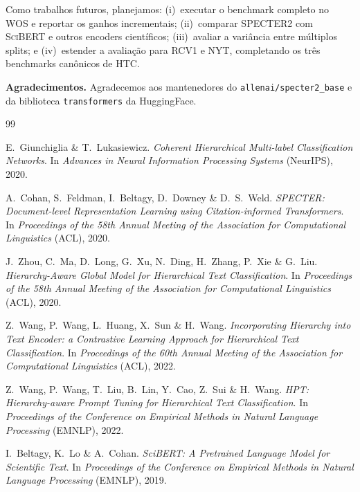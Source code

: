 \documentclass[11pt,a4paper,twoside]{article}
\begin{document}
Como trabalhos futuros, planejamos: (i)~executar o benchmark completo no WOS e
reportar os ganhos incrementais; (ii)~comparar \textsc{SPECTER2} com
\textsc{SciBERT} e outros encoders científicos; (iii)~avaliar a variância entre
múltiplos splits; e (iv)~estender a avaliação para RCV1 e NYT, completando os
três benchmarks canônicos de HTC.

\vspace{0.6em}
\noindent\textbf{Agradecimentos.}
Agradecemos aos mantenedores do \texttt{allenai/specter2\_base}
\cite{cohan2020specter} e da biblioteca \texttt{transformers} da HuggingFace.


\begin{thebibliography}{99}

E.~Giunchiglia \& T.~Lukasiewicz.
\textit{Coherent Hierarchical Multi-label Classification Networks}.
In \textit{Advances in Neural Information Processing Systems} (NeurIPS), 2020.

A.~Cohan, S.~Feldman, I.~Beltagy, D.~Downey \& D.~S.~Weld.
\textit{SPECTER: Document-level Representation Learning using Citation-informed
Transformers}.
In \textit{Proceedings of the 58th Annual Meeting of the Association for
Computational Linguistics} (ACL), 2020.

J.~Zhou, C.~Ma, D.~Long, G.~Xu, N.~Ding, H.~Zhang, P.~Xie \& G.~Liu.
\textit{Hierarchy-Aware Global Model for Hierarchical Text Classification}.
In \textit{Proceedings of the 58th Annual Meeting of the Association for
Computational Linguistics} (ACL), 2020.

Z.~Wang, P.~Wang, L.~Huang, X.~Sun \& H.~Wang.
\textit{Incorporating Hierarchy into Text Encoder: a Contrastive Learning
Approach for Hierarchical Text Classification}.
In \textit{Proceedings of the 60th Annual Meeting of the Association for
Computational Linguistics} (ACL), 2022.

Z.~Wang, P.~Wang, T.~Liu, B.~Lin, Y.~Cao, Z.~Sui \& H.~Wang.
\textit{HPT: Hierarchy-aware Prompt Tuning for Hierarchical Text Classification}.
In \textit{Proceedings of the Conference on Empirical Methods in Natural Language
Processing} (EMNLP), 2022.

I.~Beltagy, K.~Lo \& A.~Cohan.
\textit{SciBERT: A Pretrained Language Model for Scientific Text}.
In \textit{Proceedings of the Conference on Empirical Methods in Natural Language
Processing} (EMNLP), 2019.

\end{thebibliography}
\end{document}
